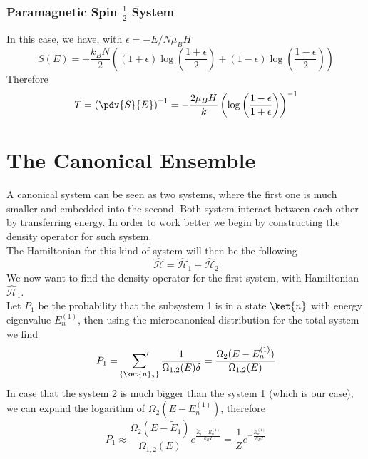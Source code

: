 \documentclass[a4paper, 11pt]{book}
\newcommand{\1}{\opr{\mathds{1}}}
\newcommand{\ham}{\mathcal{H}}
\newcommand{\opr}[1]{\hat{#1}}
\newcommand{\qsum}{\sideset{}{'}\sum}
\theoremstyle{plain}
\begin{document}
		\subsection{Paramagnetic Spin $\frac{1}{2}$ System}
		In this case, we have, with $\epsilon=-E/N\mu_BH$
		\begin{equation}
			S(E)=-\frac{k_BN}{2}\left( (1+\epsilon)\log\left( \frac{1+\epsilon}{2} \right)+(1-\epsilon)\log\left( \frac{1-\epsilon}{2} \right) \right)
			\label{eq:paramagnetentropy}
		\end{equation}
		Therefore
		\begin{equation}
			T=\left( \pdv{S}{E} \right)^{-1}=-\frac{2\mu_BH}{k}\left( \log\left( \frac{1-\epsilon}{1+\epsilon} \right) \right)^{-1}
			\label{eq:temperatureparamagnet}
		\end{equation}
		\chapter{The Canonical Ensemble}
		A canonical system can be seen as two systems, where the first one is much smaller and embedded into the second. Both system interact between each other by transferring energy. In order to work better we begin by constructing the density operator for such system.\\
		The Hamiltonian for this kind of system will then be the following
		\begin{equation}
			\opr{\ham}=\opr{\ham}_1+\opr{\ham}_2
			\label{eq:canonicalhamiltonian}
		\end{equation}
		We now want to find the density operator for the first system, with Hamiltonian $\opr{\ham}_1$.\\
		Let $P_1$ be the probability that the subsystem 1 is in a state $\ket{n}$ with energy eigenvalue $E^{(1)}_n$, then using the microcanonical distribution for the total system we find
		\begin{equation}
			P_1=\qsum_{\{\ket{n}_2\}}\frac{1}{\Omega_{1,2}(E)\delta}=\frac{\Omega_2(E-E_n^{(1)})}{\Omega_{1,2}(E)}
			\label{eq:probabilityfirstsystemgc}
		\end{equation}
		In case that the system 2 is much bigger than the system 1 (which is our case), we can expand the logarithm of $\Omega_2(E-E_n^{(1)})$, therefore
		\begin{equation}
			P_{1}\approx\frac{\Omega_2(E-\tilde{E}_1)}{\Omega_{1,2}(E)}e^{\frac{\tilde{E}_1-E_n^{(1)}}{k_BT}}=\frac{1}{Z}e^{-\frac{E_n^{(1)}}{k_BT}}
			\label{eq:probabilitysystem1approx}
		\end{equation}
\end{document}
